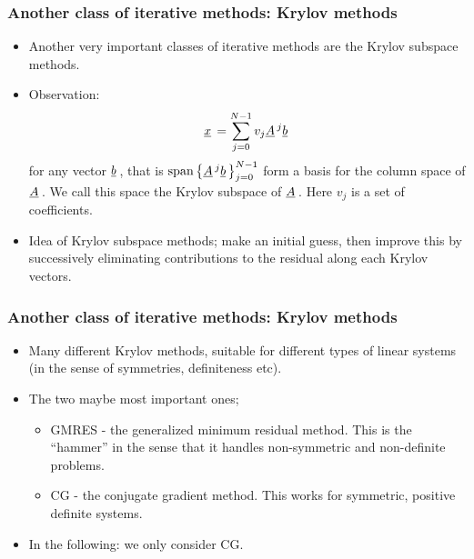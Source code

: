 \documentclass{beamer}
\newcommand{\ub}[1]{\underbar{$#1$}\,}
\begin{document}
\begin{frame}\frametitle{Another class of iterative methods: Krylov methods}
  \begin{itemize}
    \item Another very important classes of iterative methods are the Krylov subspace methods.
    \item Observation:
      \[
        \ub{x} = \sum_{j=0}^{N-1} v_j\ub{A}^j \ub{b}
      \]
      for any vector $\ub{b}$, that is $\text{span}\left\{\ub{A}^j\ub{b}\right\}_{j=0}^{N-1}$ form a basis for
      the column space of $\ub{A}$. We call this space the Krylov subspace of $\ub{A}$. Here $v_j$ is a set of coefficients.
    \item Idea of Krylov subspace methods; make an initial guess, then
      improve this by successively eliminating contributions to the
      residual along each Krylov vectors.
  \end{itemize}
\end{frame}

\begin{frame}\frametitle{Another class of iterative methods: Krylov methods}
  \begin{itemize}
    \item Many different Krylov methods, suitable for different types of
        linear systems (in the sense of symmetries, definiteness etc).
    \item The two maybe most important ones;
      \begin{itemize}
        \item GMRES - the generalized minimum residual method.
              This is the ``hammer'' in the sense that it handles non-symmetric
              and non-definite problems.
        \item CG - the conjugate gradient method.
              This works for symmetric, positive definite systems.
      \end{itemize}
    \item In the following: we only consider CG.
  \end{itemize}
\end{frame}
\end{document}
